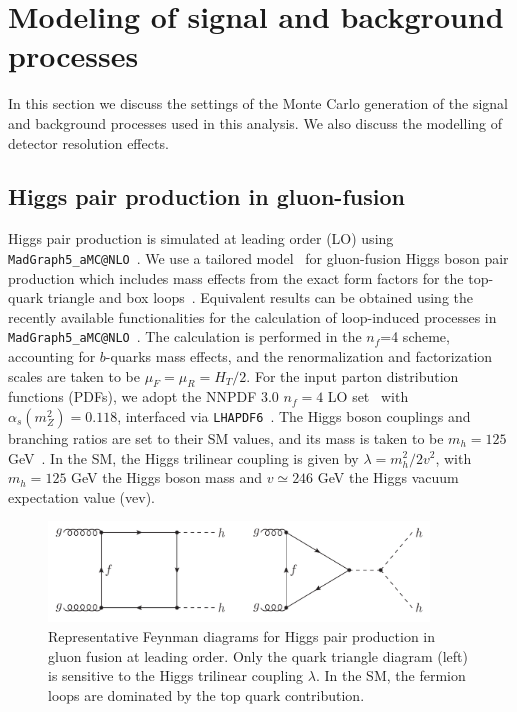 

\section{Modeling of signal and background processes}
\label{mcgeneration}

In this section we discuss the settings of the
Monte Carlo generation of the signal and background
processes used in this analysis.
%
We also discuss the modelling of detector
resolution effects.

\subsection{Higgs pair production in gluon-fusion}



Higgs pair production is simulated at leading order (LO) using
{\tt MadGraph5\_aMC@NLO}~\cite{Alwall:2014hca}.
%
We use a tailored  model~\cite{Maltoni:2014eza}
for gluon-fusion Higgs boson pair production
which includes mass effects
from the
exact form factors for the top-quark triangle and box
loops~\cite{Plehn:1996wb}.
%
Equivalent results can be obtained using
the recently available functionalities
for the calculation of loop-induced processes
in {\tt MadGraph5\_aMC@NLO}~\cite{Hirschi:2015iia}.
%
The calculation is performed in the
$n_f$=4 scheme,  accounting for  $b$-quarks mass effects,
and the renormalization and factorization
scales are taken to be $\mu_F=\mu_R=H_T/2$.
%
For the input parton distribution functions (PDFs), we 
adopt the NNPDF 3.0 $n_f = 4$ LO set~\cite{Ball:2014uwa} with
$\alpha_s(m_Z^2)=0.118$,
interfaced via {\tt LHAPDF6}~\cite{Buckley:2014ana}.
%
The Higgs boson couplings
and branching ratios are set to their SM values,
and its mass is taken to be
$m_h=125$ GeV~\cite{Aad:2014aba,Khachatryan:2014jba,Aad:2015zhl}.
%
In the SM, the Higgs trilinear coupling
is given by $\lambda=m_h^2/2v^2$, with $m_h=125$ GeV
the Higgs boson mass and $v\simeq 246$ GeV the Higgs vacuum expectation
value (vev).
%


\begin{figure}[t]
\begin{center}
  \includegraphics[width=0.90\textwidth]{plots/hhFeyn.pdf}
  \caption{\small Representative Feynman diagrams
    for Higgs pair production in gluon fusion at
    leading order.
    Only the quark triangle diagram (left) is sensitive to the Higgs trilinear coupling
    $\lambda$.
    In the SM, the fermion loops are dominated by the top quark contribution.
}
\label{fig:hhFeyn}
\end{center}
\end{figure}


